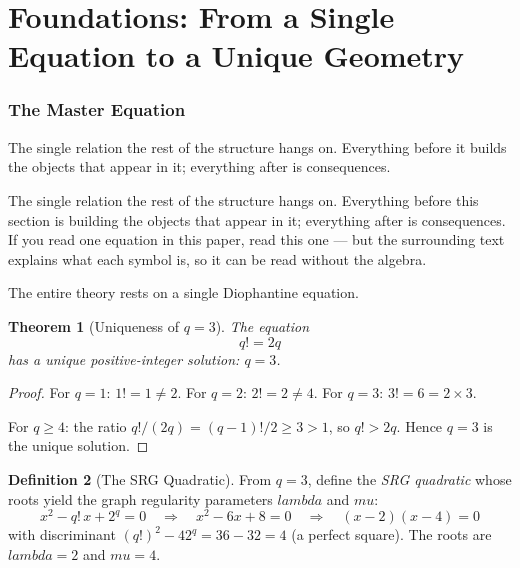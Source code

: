 \documentclass[12pt,a4paper]{article}
\def\lambda{lambda}%
\def\mu{mu}%
\def\cdot{ }%
\newtheorem{theorem}{Theorem}[section]
\theoremstyle{definition}
\newtheorem{definition}[theorem]{Definition}
\begin{document}
\part{Foundations: From a Single Equation to a Unique Geometry}

\section{The Master Equation}

\begin{plainbox}
The single relation the rest of the structure hangs on. Everything before it builds
the objects that appear in it; everything after is consequences.
\end{plainbox}


\begin{plainbox}
The single relation the rest of the structure hangs on. Everything before this
section is building the objects that appear in it; everything after is consequences. If you
read one equation in this paper, read this one --- but the surrounding text explains what
each symbol is, so it can be read without the algebra.
\end{plainbox}

\label{sec:master}

The entire theory rests on a single Diophantine equation.

\begin{theorem}[Uniqueness of $q=3$]
\label{thm:uniqueness}
The equation
\begin{equation}
\boxed{q! = 2q}
\label{eq:master}
\end{equation}
has a unique positive-integer solution: $q = 3$.
\end{theorem}

\begin{proof}
For $q=1$: $1!=1\neq 2$.
For $q=2$: $2!=2\neq 4$.
For $q=3$: $3!=6 = 2\times 3$. \checkmark

For $q\geq 4$: the ratio $q!/(2q) = (q-1)!/2 \geq 3 > 1$, so $q!>2q$.
Hence $q=3$ is the unique solution. \qedhere
\end{proof}

\begin{definition}[The SRG Quadratic]
\label{def:quadratic}
From $q=3$, define the \emph{SRG quadratic} whose roots yield the
graph regularity parameters $\lambda$ and $\mu$:
\begin{equation}
x^2 - q!\,x + 2^q = 0 \quad\Longrightarrow\quad
x^2 - 6x + 8 = 0 \quad\Longrightarrow\quad
(x-2)(x-4) = 0
\label{eq:quadratic}
\end{equation}
with discriminant $(q!)^2 - 4\cdot 2^q = 36 - 32 = 4$ (a perfect square).
The roots are $\lambda = 2$ and $\mu = 4$.
\end{definition}
\end{document}
